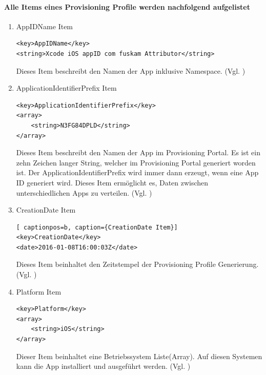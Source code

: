 \paragraph{Alle Items eines Provisioning Profile werden nachfolgend aufgelistet}
\begin{enumerate}
    \item AppIDName Item

\begin{lstlisting}[captionpos=b, caption={AppIDName Item}]
<key>AppIDName</key>
<string>Xcode iOS appID com fuskam Attributor</string>
\end{lstlisting}
Dieses Item beschreibt den Namen der App inklusive Namespace. (Vgl. \cite{iOSSec[5], Hacking[1]})

    \item ApplicationIdentifierPrefix Item
\begin{lstlisting}[captionpos=b, caption={ApplicationIdentifierPrefix Item}]
<key>ApplicationIdentifierPrefix</key>
<array>
    <string>N3FG84DPLD</string>
</array>
\end{lstlisting}
Dieses Item beschreibt den Namen der App im Provisioning Portal. Es ist ein zehn Zeichen langer String, welcher im Provisioning Portal generiert worden ist. Der ApplicationIdentifierPrefix wird immer dann erzeugt, wenn eine App ID generiert wird. Dieses Item ermöglicht es, Daten zwischen unterschiedlichen Apps zu verteilen. (Vgl. \cite{iOSSec[5], Hacking[1]})

    \item CreationDate Item
\begin{lstlisting}[ captionpos=b, caption={CreationDate Item}]        
<key>CreationDate</key>
<date>2016-01-08T16:00:03Z</date>
\end{lstlisting}
Dieses Item beinhaltet den Zeitstempel der Provisioning Profile Generierung. (Vgl. \cite{iOSSec[5], Hacking[1]})

    \item Platform Item
\begin{lstlisting}[captionpos=b, caption={Platform Item}]        
<key>Platform</key>
<array>
    <string>iOS</string>
</array>
\end{lstlisting}
Dieser Item beinhaltet eine Betriebssystem Liste(Array). Auf diesen Systemen kann die App installiert und ausgeführt werden. (Vgl. \cite{iOSSec[5], Hacking[1]})


\end{enumerate}
